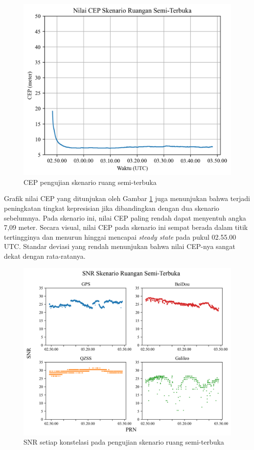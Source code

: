 \begin{figure}[H]
	\centering
	\includegraphics[width=13cm]{contents/chapter-4/3-skenario-semioutdoor/cep.png}
	\caption{CEP pengujian skenario ruang semi-terbuka}
	\label{Fig: semioutdoor-cep}
\end{figure}

Grafik nilai CEP yang ditunjukan oleh Gambar \ref{Fig: semioutdoor-cep} juga menunjukan bahwa terjadi peningkatan tingkat kepresisian jika dibandingkan dengan dua skenario sebelumnya. Pada skenario ini, nilai CEP paling rendah dapat menyentuh angka 7,09 meter. Secara visual, nilai CEP pada skenario ini sempat berada dalam titik tertingginya dan menurun hinggai mencapai \textit{steady state} pada pukul 02.55.00 UTC. Standar deviasi yang rendah menunjukan bahwa nilai CEP-nya sangat dekat dengan rata-ratanya.

\begin{figure}[H]
	\centering
	\captionsetup{justification=centering}
	\includegraphics[width=13cm]{contents/chapter-4/3-skenario-semioutdoor/snr.png}
	\caption{SNR setiap konstelasi pada pengujian skenario ruang semi-terbuka}
	\label{Fig: semioutdoor-snr}
\end{figure}

